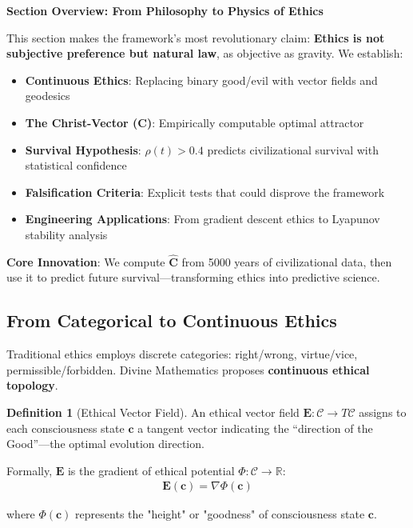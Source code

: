 \documentclass[11pt,a4paper]{article}
\theoremstyle{definition}
\newtheorem{definition}{Definition}[section]
\theoremstyle{remark}
\newcommand{\RR}{\mathbb{R}}
\newcommand{\CC}{\mathcal{C}}
\newcommand{\EE}{\mathbf{E}}
\newcommand{\cc}{\mathbf{c}}
\begin{document}
\begin{mdframed}[backgroundcolor=cyan!5,linewidth=2pt]
\textbf{Section Overview: From Philosophy to Physics of Ethics}

This section makes the framework's most revolutionary claim: \textbf{Ethics is not subjective preference but natural law}, as objective as gravity. We establish:

\begin{itemize}[nosep]
    \item \textbf{Continuous Ethics}: Replacing binary good/evil with vector fields and geodesics
    \item \textbf{The Christ-Vector (\(\mathbf{C}\))}: Empirically computable optimal attractor
    \item \textbf{Survival Hypothesis}: \(\rho(t) > 0.4\) predicts civilizational survival with statistical confidence
    \item \textbf{Falsification Criteria}: Explicit tests that could disprove the framework
    \item \textbf{Engineering Applications}: From gradient descent ethics to Lyapunov stability analysis
\end{itemize}

\textbf{Core Innovation}: We compute \(\hat{\mathbf{C}}\) from 5000 years of civilizational data, then use it to predict future survival—transforming ethics into predictive science.
\end{mdframed}

\subsection{From Categorical to Continuous Ethics}

Traditional ethics employs discrete categories: right/wrong, virtue/vice, permissible/forbidden. Divine Mathematics proposes \textbf{continuous ethical topology}.

\begin{definition}[Ethical Vector Field]
An ethical vector field \(\EE: \CC \to T\CC\) assigns to each consciousness state \(\cc\) a tangent vector indicating the ``direction of the Good''—the optimal evolution direction.

Formally, \(\EE\) is the gradient of ethical potential \(\Phi: \CC \to \RR\):
\begin{align}
\EE(\cc) = \nabla \Phi(\cc)
\end{align}

where \(\Phi(\cc)\) represents the "height" or "goodness" of consciousness state \(\cc\).
\end{definition}
\end{document}
